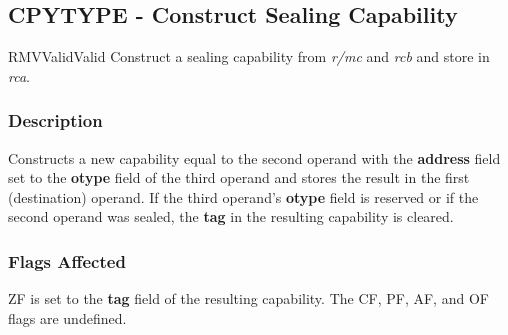 \clearpage
{}
{}
\subsection*{CPYTYPE - Construct Sealing Capability}

\begin{x86opcodetable}
  {RMV}{Valid}{Valid}
  {Construct a sealing capability from \emph{r/mc} and \emph{rcb} and
    store in \emph{rca}.}
\end{x86opcodetable}

\begin{x86opentable}
\end{x86opentable}

\subsubsection*{Description}

Constructs a new capability equal to the second operand with the
\textbf{address} field set to the \textbf{otype} field of the third
operand and stores the result in the first (destination) operand.
If the third operand's \textbf{otype} field is reserved or if the
second operand was sealed, the \textbf{tag} in the resulting
capability is cleared.

\subsubsection*{Flags Affected}

ZF is set to the \textbf{tag} field of the resulting capability.  The
CF, PF, AF, and OF flags are undefined.
